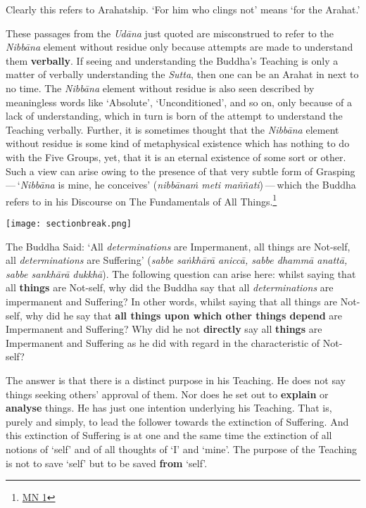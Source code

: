 Clearly this refers to Arahatship. `For him who clings not' means `for the Arahat.'

These passages from the \emph{Udāna} just quoted are misconstrued to refer to the \emph{Nibbāna} element without residue only because attempts are made to understand them \textbf{verbally}. If seeing and understanding the Buddha's Teaching is only a matter of verbally understanding the \emph{Sutta}, then one can be an Arahat in next to no time. The \emph{Nibbāna} element without residue is also seen described by meaningless words like `Absolute', `Unconditioned', and so on, only because of a lack of understanding, which in turn is born of the attempt to understand the Teaching verbally. Further, it is sometimes thought that the \emph{Nibbāna} element without residue is some kind of metaphysical existence which has nothing to do with the Five Groups, yet, that it is an eternal existence of some sort or other. Such a view can arise owing to the presence of that very subtle form of Grasping --- `\emph{Nibbāna} is mine, he conceives' (\emph{nibbānaṁ meti maññati}) --- which the Buddha refers to in his Discourse on The Fundamentals of All Things.\footnote{\href{https://suttacentral.net/mn1/en/bodhi}{MN 1}}

\texttt{[image: sectionbreak.png]}

The Buddha Said: `All \emph{determinations} are Impermanent, all things are Not-self, all \emph{determinations} are Suffering' (\emph{sabbe saṅkhārā aniccā, sabbe dhammā anattā, sabbe sankhārā dukkhā}). The following question can arise here: whilst saying that all \textbf{things} are Not-self, why did the Buddha say that all \emph{determinations} are impermanent and Suffering? In other words, whilst saying that all things are Not-self, why did he say that \textbf{all things upon which other things depend} are Impermanent and Suffering? Why did he not \textbf{directly} say all \textbf{things} are Impermanent and Suffering as he did with regard in the characteristic of Not-self?

The answer is that there is a distinct purpose in his Teaching. He does not say things seeking others' approval of them. Nor does he set out to \textbf{explain} or \textbf{analyse} things. He has just one intention underlying his Teaching. That is, purely and simply, to lead the follower towards the extinction of Suffering. And this extinction of Suffering is at one and the same time the extinction of all notions of `self' and of all thoughts of `I' and `mine'. The purpose of the Teaching is not to save `self' but to be saved \textbf{from} `self'.


